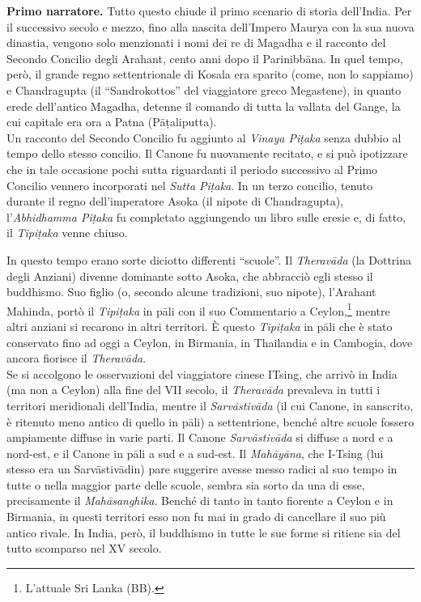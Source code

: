 \textbf{Primo narratore.} Tutto questo chiude il primo scenario di storia
dell’India. Per il successivo secolo e mezzo, fino alla nascita
dell’Impero Maurya con la sua nuova dinastia, vengono solo menzionati i
nomi dei re di Magadha e il racconto del Secondo Concilio degli Arahant,
cento anni dopo il Parinibbāna. In quel tempo, però, il grande regno
settentrionale di Kosala era sparito (come, non lo sappiamo) e
Chandragupta (il “Sandrokottos” del viaggiatore greco Megastene), in
quanto erede dell’antico Magadha, detenne il comando di tutta la vallata
del Gange, la cui capitale era ora a Patna (Pāṭaliputta). \\
Un racconto del Secondo Concilio fu aggiunto al \emph{Vinaya Piṭaka} senza
dubbio al tempo dello stesso concilio. Il Canone fu nuovamente recitato,
e si può ipotizzare che in tale occasione pochi sutta riguardanti il
periodo successivo al Primo Concilio vennero incorporati nel \emph{Sutta
Piṭaka}. In un terzo concilio, tenuto durante il regno dell’imperatore
Asoka (il nipote di Chandragupta), l’\emph{Abhidhamma Piṭaka} fu completato
aggiungendo un libro sulle eresie e, di fatto, il \emph{Tipiṭaka} venne
chiuso.


In questo tempo erano sorte diciotto differenti “scuole”. Il
\emph{Theravāda} (la Dottrina degli Anziani) divenne dominante sotto Asoka,
che abbracciò egli stesso il buddhismo. Suo figlio (o, secondo alcune
tradizioni, suo nipote), l’Arahant Mahinda, portò il \emph{Tipiṭaka} in pāli
con il suo Commentario a Ceylon,\footnote{L’attuale Sri Lanka (BB).}
mentre altri anziani
si recarono in altri territori. È questo \emph{Tipiṭaka} in pāli che è stato
conservato fino ad oggi a Ceylon, in Birmania, in Thailandia e in
Cambogia, dove ancora fiorisce il \emph{Theravāda}. \\
Se si accolgono le osservazioni del viaggiatore cinese ITsing, che
arrivò in India (ma non a Ceylon) alla fine del VII secolo, il
\emph{Theravāda} prevaleva in tutti i territori meridionali dell’India,
mentre il \emph{Sarvāstivāda} (il cui Canone, in sanscrito, è ritenuto meno
antico di quello in pāli) a settentrione, benché altre scuole fossero
ampiamente diffuse in varie parti. Il Canone \emph{Sarvāstivāda} si diffuse a
nord e a nord-est, e il Canone in pāli a sud e a sud-est. Il \emph{Mahāyāna},
che I-Tsing (lui stesso era un Sarvāstivādin) pare suggerire avesse
messo radici al suo tempo in tutte o nella maggior parte delle scuole,
sembra sia sorto da una di esse, precisamente il \emph{Mahāsanghika}. Benché
di tanto in tanto fiorente a Ceylon e in Birmania, in questi territori
esso non fu mai in grado di cancellare il suo più antico rivale. In
India, però, il buddhismo in tutte le sue forme si ritiene sia del tutto
scomparso nel XV secolo.


